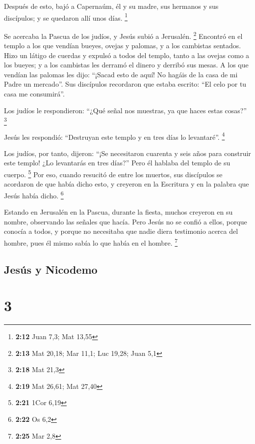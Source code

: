  Después de esto, bajó a Capernaúm, él y su madre, sus
hermanos y sus discípulos; y se quedaron allí unos días. \footnote{\textbf{2:12}
  Juan 7,3; Mat 13,55}

 Se acercaba la Pascua de los judíos, y Jesús subió a
Jerusalén. \footnote{\textbf{2:13} Mat 20,18; Mar 11,1; Luc 19,28; Juan
  5,1}  Encontró en el templo a los que vendían bueyes,
ovejas y palomas, y a los cambistas sentados.  Hizo un
látigo de cuerdas y expulsó a todos del templo, tanto a las ovejas como
a los bueyes; y a los cambistas les derramó el dinero y derribó sus
mesas.  A los que vendían las palomas les dijo: ``¡Sacad
esto de aquí! No hagáis de la casa de mi Padre un mercado''.
 Sus discípulos recordaron que estaba escrito: ``El celo
por tu casa me consumirá''.

 Los judíos le respondieron: ``¿Qué señal nos muestras,
ya que haces estas cosas?'' \footnote{\textbf{2:18} Mat 21,3}

 Jesús les respondió: ``Destruyan este templo y en tres
días lo levantaré''. \footnote{\textbf{2:19} Mat 26,61; Mat 27,40}

 Los judíos, por tanto, dijeron: ``¡Se necesitaron
cuarenta y seis años para construir este templo! ¿Lo levantarás en tres
días?''  Pero él hablaba del templo de su cuerpo.
\footnote{\textbf{2:21} 1Cor 6,19}  Por eso, cuando
resucitó de entre los muertos, sus discípulos se acordaron de que había
dicho esto, y creyeron en la Escritura y en la palabra que Jesús había
dicho. \footnote{\textbf{2:22} Os 6,2}

 Estando en Jerusalén en la Pascua, durante la fiesta,
muchos creyeron en su nombre, observando las señales que hacía.
 Pero Jesús no se confió a ellos, porque conocía a todos,
 y porque no necesitaba que nadie diera testimonio acerca
del hombre, pues él mismo sabía lo que había en el hombre. \footnote{\textbf{2:25}
  Mar 2,8}

\hypertarget{jesuxfas-y-nicodemo}{%
\subsection{Jesús y Nicodemo}\label{jesuxfas-y-nicodemo}}

\hypertarget{section-2}{%
\section{3}\label{section-2}}

